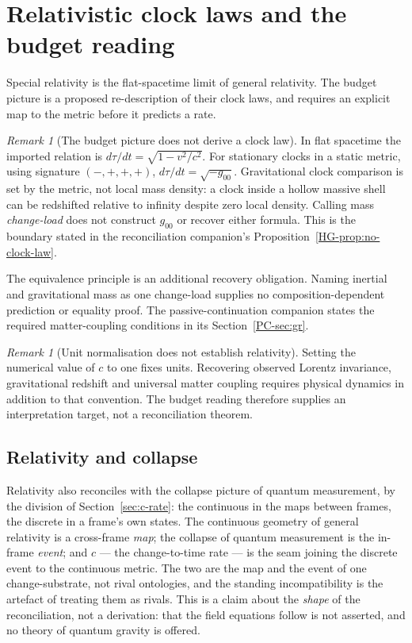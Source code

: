 \documentclass[11pt,a4paper]{article}
\theoremstyle{remark}\newtheorem{remark}[definition]{Remark}
\begin{document}
\section{Relativistic clock laws and the budget reading}\label{sec:sr-gr}
Special relativity is the flat-spacetime limit of general relativity. The budget picture is a proposed re-description of their clock laws, and requires an explicit map to the metric before it predicts a rate.

\begin{remark}[The budget picture does not derive a clock law]\label{prop:sr-gr}
In flat spacetime the imported relation is $d\tau/dt=\sqrt{1-v^2/c^2}$.
For stationary clocks in a static metric, using signature $(-,+,+,+)$,
$d\tau/dt=\sqrt{-g_{00}}$. Gravitational clock comparison is set by the
metric, not local mass density: a clock inside a hollow massive shell can be
redshifted relative to infinity despite zero local density. Calling mass
\emph{change-load} does not construct $g_{00}$ or recover either formula.
This is the boundary stated in the reconciliation companion's
Proposition~\ref{HG-prop:no-clock-law}.
\end{remark}
The equivalence principle is an additional recovery obligation. Naming inertial
and gravitational mass as one change-load supplies no composition-dependent
prediction or equality proof. The passive-continuation companion states the
required matter-coupling conditions in its Section~\ref{PC-sec:gr}.

\begin{remark}[Unit normalisation does not establish relativity]\label{cor:reconcile}
Setting the numerical value of $c$ to one fixes units. Recovering observed
Lorentz invariance, gravitational redshift and universal matter coupling
requires physical dynamics in addition to that convention. The budget reading
therefore supplies an interpretation target, not a reconciliation theorem.
\end{remark}

\subsection{Relativity and collapse}\label{sec:collapse}
Relativity also reconciles with the collapse picture of quantum measurement, by
the division of Section~\ref{sec:c-rate}: the
continuous in the maps between frames, the discrete in a frame's own states. The continuous
geometry of general relativity is a cross-frame \emph{map}; the collapse of
quantum measurement is the in-frame \emph{event}; and $c$ --- the change-to-time
rate --- is the seam joining the discrete event to the continuous metric. The two
are the map and the event of one change-substrate, not rival ontologies, and the
standing incompatibility is the artefact of treating them as rivals. This is a
claim about the \emph{shape} of the reconciliation, not a derivation: that the
field equations follow is not asserted, and no theory of quantum gravity is
offered.
\end{document}
